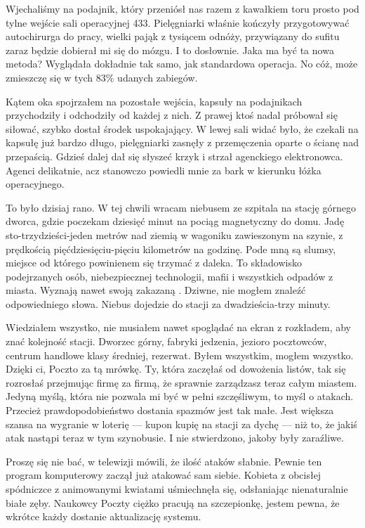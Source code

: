 Wjechaliśmy na podajnik, który przeniósł nas razem z kawałkiem toru prosto pod tylne wejście sali operacyjnej 433.
Pielęgniarki właśnie kończyły przygotowywać autochirurga do pracy, wielki pająk z tysiącem odnóży, przywiązany do sufitu zaraz będzie dobierał mi się do mózgu. I to dosłownie.
Jaka ma być ta nowa metoda? Wyglądała dokładnie tak samo, jak standardowa operacja. No cóż, może zmieszczę się w tych 83\% udanych zabiegów.

Kątem oka spojrzałem na pozostałe wejścia, kapsuły na podajnikach przychodziły i odchodziły od każdej z nich.
Z prawej ktoś nadal próbował się siłować, szybko dostał środek uspokajający.
W lewej sali widać było, że czekali na kapsułę już bardzo długo, pielęgniarki zasnęły z przemęczenia oparte o ścianę nad przepaścią.
Gdzieś dalej dał się słyszeć krzyk i strzał agenckiego elektronowca.
Agenci delikatnie, acz stanowczo powiedli mnie za bark w kierunku łóżka operacyjnego.

\divider{}

To było dzisiaj rano. W tej chwili wracam niebusem ze szpitala na stację górnego dworca, gdzie poczekam dziesięć minut na pociąg magnetyczny do domu.
Jadę sto-trzydzieści-jeden metrów nad ziemią w wagoniku zawieszonym na szynie, z prędkością pięćdziesięciu-pięciu kilometrów na godzinę. 
Pode mną są slumsy, miejsce od którego powinienem się trzymać z daleka. 
To składowisko podejrzanych osób, niebezpiecznej technologii, mafii i wszystkich odpadów z miasta.
Wyznają nawet swoją zakazaną \censor{}.
Dziwne, nie mogłem znaleźć odpowiedniego słowa.
Niebus dojedzie do stacji za dwadzieścia-trzy minuty.

Wiedziałem wszystko, nie musiałem nawet spoglądać na ekran z rozkładem, aby znać kolejność stacji.
Dworzec górny, fabryki jedzenia, jezioro pocztowców, centrum handlowe klasy średniej, rezerwat.
Byłem wszystkim, mogłem wszystko. 
Dzięki ci, Poczto za tą mrówkę. Ty, która zaczęłaś od dowożenia listów, tak się rozrosłaś przejmując firmę za firmą, że sprawnie zarządzasz teraz całym miastem.
Jedyną myślą, która nie pozwala mi być w pełni szczęśliwym, to myśl o atakach. Przecież prawdopodobieństwo dostania spazmów jest tak małe.
Jest większa szansa na wygranie w loterię --- kupon kupię na stacji za dychę --- niż to, że jakiś atak nastąpi teraz w tym szynobusie.
I nie stwierdzono, jakoby były zaraźliwe.

\ds{} Proszę się nie bać, w telewizji mówili, że ilość ataków słabnie. 
Pewnie ten program komputerowy zaczął już atakować sam siebie. \dm{} Kobieta z obcisłej spódniczce z animowanymi kwiatami uśmiechnęła się, odsłaniając nienaturalnie białe zęby. \dm{}
Naukowcy Poczty ciężko pracują na szczepionkę, jestem pewna, że wkrótce każdy dostanie aktualizację systemu. \de{}

